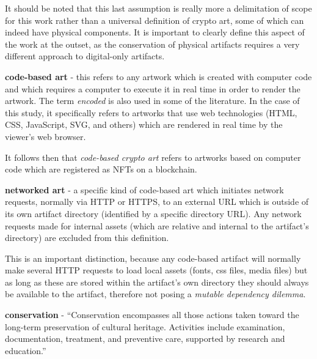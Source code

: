 It should be noted that this last assumption is really more a delimitation of scope for this work rather than a universal definition of crypto art, some of which can indeed have physical components. It is important to clearly define this aspect of the work at the outset, as the conservation of physical artifacts requires a very different approach to digital-only artifacts.

\vspace{0.5cm}

\textbf{code-based art} - this refers to any artwork which is created with computer code and which requires a computer to execute it in real time in order to render the artwork. The term \emph{encoded} is also used in some of the literature. In the case of this study, it specifically refers to artworks that use web technologies (HTML, CSS, JavaScript, SVG, and others) which are rendered in real time by the viewer's web browser.

\vspace{0.5cm}

It follows then that \emph{code-based crypto art} refers to artworks based on computer code which are registered as NFTs on a blockchain.

\vspace{0.5cm}

\textbf{networked art} - a specific kind of code-based art which initiates network requests, normally via HTTP or HTTPS, to an external URL which is outside of its own artifact directory (identified by a specific directory URL). Any network requests made for internal assets (which are relative and internal to the artifact's directory) are excluded from this definition.

\vspace{0.5cm}

This is an important distinction, because any code-based artifact will normally make several HTTP requests to load local assets (fonts, css files, media files) but as long as these are stored within the artifact's own directory they should always be available to the artifact, therefore not posing a \emph{mutable dependency dilemma}.

\vspace{0.5cm}

\textbf{conservation} - ``Conservation encompasses all those actions taken toward the long-term preservation of cultural heritage. Activities include examination, documentation, treatment, and preventive care, supported by research and education.''  \cite{WhatConservation}

